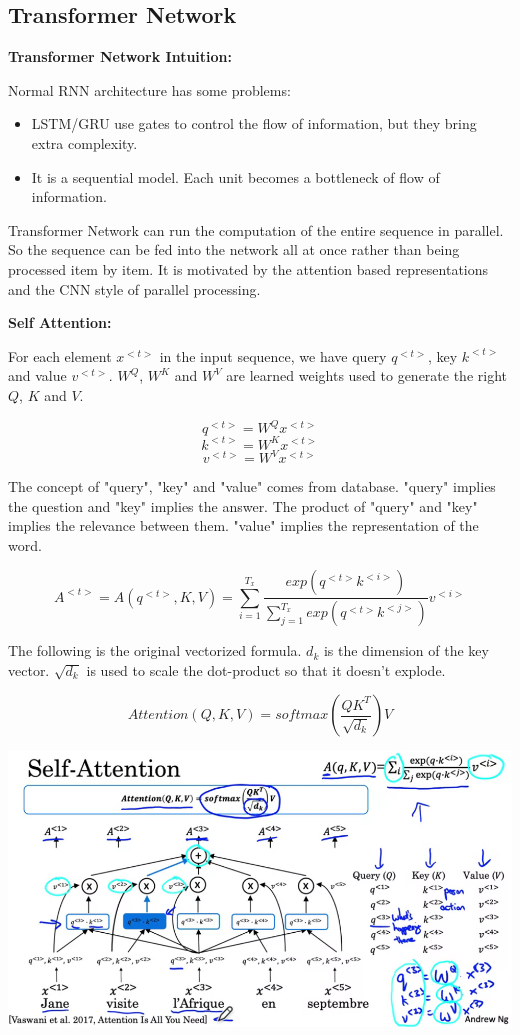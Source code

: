 \documentclass{article}
\begin{document}
\subsection{Transformer Network}

\noindent \textbf{Transformer Network Intuition:}

\noindent Normal RNN architecture has some problems:

\begin{itemize}
    \item LSTM/GRU use gates to control the flow of information, but they bring extra complexity.
    \item It is a sequential model. Each unit becomes a bottleneck of flow of information.
\end{itemize}

\noindent Transformer Network can run the computation of the entire sequence in parallel. So the sequence can be fed into the network all at once rather than being processed item by item. It is motivated by the attention based representations and the CNN style of parallel processing.

\bigskip

\noindent \textbf{Self Attention:}

\noindent For each element \(x^{<t>}\) in the input sequence, we have query \(q^{<t>}\), key \(k^{<t>}\) and value \(v^{<t>}\). \(W^{Q}\), \(W^{K}\) and \(W^{V}\) are learned weights used to generate the right \(Q\), \(K\) and \(V\).

\[q^{<t>} = W^{Q} x^{<t>}\]
\[k^{<t>} = W^{K} x^{<t>}\]
\[v^{<t>} = W^{V} x^{<t>}\]

\noindent The concept of "query", "key" and "value" comes from database. "query" implies the question and "key" implies the answer. The product of "query" and "key" implies the relevance between them. "value" implies the representation of the word.

\[A^{<t>} = A(q^{<t>}, K, V) = \sum_{i = 1}^{T_{x}} \frac{exp(q^{<t>} k^{<i>})}{\sum_{j = 1}^{T_{x}} exp(q^{<t>} k^{<j>})} v^{<i>}\]

\noindent The following is the original vectorized formula. \(d_{k}\) is the dimension of the key vector. \(\sqrt{d_{k}}\) is used to scale the dot-product so that it doesn't explode.

\[Attention(Q, K, V) = softmax(\frac{QK^{T}}{\sqrt{d_{k}}}) V\]

\begin{center}
\includegraphics[scale=0.3]{./images/self_attention.png}
\end{center}
\end{document}
